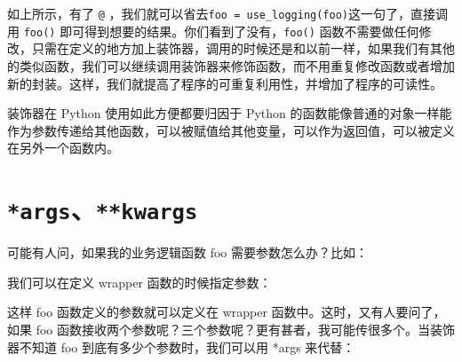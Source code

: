 \documentclass[]{ctexbook}
\newenvironment{Shaded}{\begin{snugshade}}{\end{snugshade}}
\newcommand{\BuiltInTok}[1]{#1}
\newcommand{\ControlFlowTok}[1]{\textcolor[rgb]{0.13,0.29,0.53}{\textbf{#1}}}
\newcommand{\KeywordTok}[1]{\textcolor[rgb]{0.13,0.29,0.53}{\textbf{#1}}}
\newcommand{\NormalTok}[1]{#1}
\newcommand{\OperatorTok}[1]{\textcolor[rgb]{0.81,0.36,0.00}{\textbf{#1}}}
\newcommand{\SpecialCharTok}[1]{\textcolor[rgb]{0.00,0.00,0.00}{#1}}
\newcommand{\StringTok}[1]{\textcolor[rgb]{0.31,0.60,0.02}{#1}}
\newcommand{\VariableTok}[1]{\textcolor[rgb]{0.00,0.00,0.00}{#1}}
\begin{document}
如上所示，有了 \texttt{@} ，我们就可以省去\texttt{foo\ =\ use\_logging(foo)}这一句了，直接调用 \texttt{foo()} 即可得到想要的结果。你们看到了没有，\texttt{foo()} 函数不需要做任何修改，只需在定义的地方加上装饰器，调用的时候还是和以前一样，如果我们有其他的类似函数，我们可以继续调用装饰器来修饰函数，而不用重复修改函数或者增加新的封装。这样，我们就提高了程序的可重复利用性，并增加了程序的可读性。

装饰器在 Python 使用如此方便都要归因于 Python 的函数能像普通的对象一样能作为参数传递给其他函数，可以被赋值给其他变量，可以作为返回值，可以被定义在另外一个函数内。

\hypertarget{argskwargs}{%
\section{\texorpdfstring{\texttt{*args}、\texttt{**kwargs}}{*args、**kwargs}}\label{argskwargs}}

可能有人问，如果我的业务逻辑函数 foo 需要参数怎么办？比如：

\begin{Shaded}
\end{Shaded}

我们可以在定义 wrapper 函数的时候指定参数：

\begin{Shaded}
\end{Shaded}

这样 foo 函数定义的参数就可以定义在 wrapper 函数中。这时，又有人要问了，如果 foo 函数接收两个参数呢？三个参数呢？更有甚者，我可能传很多个。当装饰器不知道 foo 到底有多少个参数时，我们可以用 *args 来代替：

\begin{Shaded}
\end{Shaded}
\end{document}
